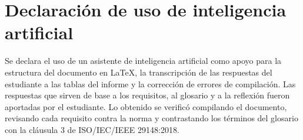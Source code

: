 \documentclass[12pt,a4paper]{article}
\begin{document}
\section{Declaración de uso de inteligencia artificial}
\label{sec:ia}

Se declara el uso de un asistente de inteligencia artificial como apoyo
para la estructura del documento en LaTeX, la transcripción de las
respuestas del estudiante a las tablas del informe y la corrección de
errores de compilación. Las respuestas que sirven de base a los requisitos,
al glosario y a la reflexión fueron aportadas por el estudiante. Lo
obtenido se verificó compilando el documento, revisando cada requisito
contra la norma y contrastando los términos del glosario con la cláusula 3
de ISO/IEC/IEEE 29148:2018.

\printbibliography[title={Referencias}]
\end{document}
